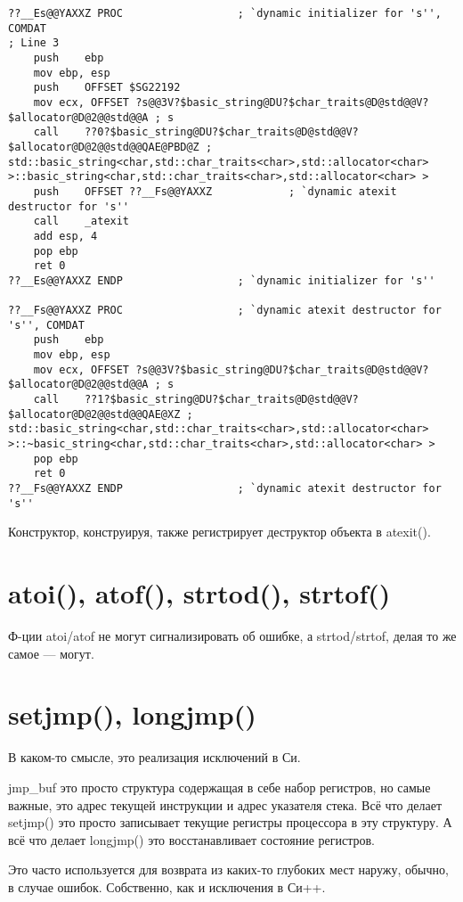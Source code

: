 \begin{lstlisting}[caption=MSVC 2010]
??__Es@@YAXXZ PROC					; `dynamic initializer for 's'', COMDAT
; Line 3
	push	ebp
	mov	ebp, esp
	push	OFFSET $SG22192
	mov	ecx, OFFSET ?s@@3V?$basic_string@DU?$char_traits@D@std@@V?$allocator@D@2@@std@@A ; s
	call	??0?$basic_string@DU?$char_traits@D@std@@V?$allocator@D@2@@std@@QAE@PBD@Z ; std::basic_string<char,std::char_traits<char>,std::allocator<char> >::basic_string<char,std::char_traits<char>,std::allocator<char> >
	push	OFFSET ??__Fs@@YAXXZ			; `dynamic atexit destructor for 's''
	call	_atexit
	add	esp, 4
	pop	ebp
	ret	0
??__Es@@YAXXZ ENDP					; `dynamic initializer for 's''

??__Fs@@YAXXZ PROC					; `dynamic atexit destructor for 's'', COMDAT
	push	ebp
	mov	ebp, esp
	mov	ecx, OFFSET ?s@@3V?$basic_string@DU?$char_traits@D@std@@V?$allocator@D@2@@std@@A ; s
	call	??1?$basic_string@DU?$char_traits@D@std@@V?$allocator@D@2@@std@@QAE@XZ ; std::basic_string<char,std::char_traits<char>,std::allocator<char> >::~basic_string<char,std::char_traits<char>,std::allocator<char> >
	pop	ebp
	ret	0
??__Fs@@YAXXZ ENDP					; `dynamic atexit destructor for 's''
\end{lstlisting}

Конструктор, конструируя, также регистрирует деструктор объекта в atexit().

\section{atoi(), atof(), strtod(), strtof()}

Ф-ции atoi/atof не могут сигнализировать об ошибке, а strtod/strtof, делая то же самое --- могут.



\section{setjmp(), longjmp()}

В каком-то смысле, это реализация исключений в Си.

jmp\_buf это просто структура содержащая в себе набор регистров, но самые важные, это адрес текущей инструкции
и адрес указателя стека.
Всё что делает setjmp() это просто записывает текущие регистры процессора в эту структуру.
А всё что делает longjmp() это восстанавливает состояние регистров.

Это часто используется для возврата из каких-то глубоких мест наружу, обычно, в случае ошибок.
Собственно, как и исключения в Си++.

